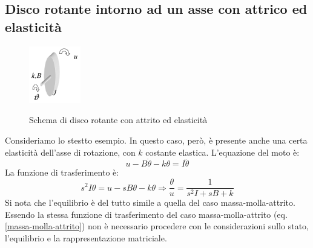 \documentclass[a4paper]{report}
\begin{document}
\subsection{Disco rotante intorno ad un asse con attrico ed
  elasticit\`a}
\begin{figure}[!b]
  \centering
  \includegraphics[width=0.2\textwidth]{./images/discorotanteattritoelasticita.png}
  \label{fig:discorotanteattritoelasticita}
  \caption{Schema di disco rotante con attrito ed elasticit\`a\label{fig:discorotanteattritoelasticita}}
\end{figure}
Consideriamo lo stestto esempio. In questo caso, per\`o, \`e presente
anche una certa elasticit\`a dell'asse di rotazione, con $k$ costante
elastica. L'equazione del moto \`e:
$$u - B\dot{\theta} - k \theta = I \ddot{\theta}$$
La funzione di trasferimento \`e:
$$s^2 I \theta = u - s B \theta - k \theta \Rightarrow
\frac{\theta}{u} = \frac{1}{s^2 I + s B  + k}$$
Si nota che l'equilibrio \`e del tutto simile a quella del caso
massa-molla-attrito. Essendo la stessa funzione di trasferimento del
caso massa-molla-attrito (eq. \ref{massa-molla-attrito}) non \`e
necessario procedere con le considerazioni sullo stato, l'equilibrio e
la rappresentazione matriciale.
\end{document}
